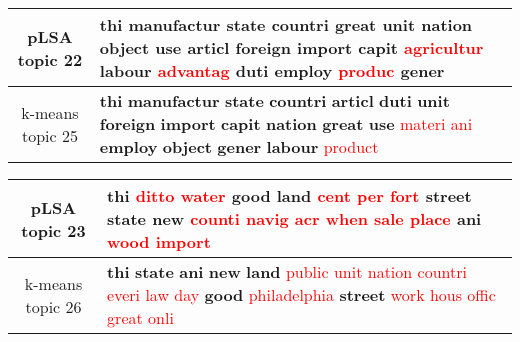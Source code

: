 \begin{center}\begin{tabularx}{\textwidth} {
  | c | >{\raggedright\arraybackslash}X | } \hline 
pLSA topic 22 & \textbf{thi} \textbf{manufactur} \textbf{state} \textbf{countri} \textbf{great} \textbf{unit} \textbf{nation} \textbf{object} \textbf{use} \textbf{articl} \textbf{foreign} \textbf{import} \textbf{capit} \textcolor{red}{agricultur} \textbf{labour} \textcolor{red}{advantag} \textbf{duti} \textbf{employ} \textcolor{red}{produc} \textbf{gener} \\ \hline 
k-means topic 25 & \textbf{thi} \textbf{manufactur} \textbf{state} \textbf{countri} \textbf{articl} \textbf{duti} \textbf{unit} \textbf{foreign} \textbf{import} \textbf{capit} \textbf{nation} \textbf{great} \textbf{use} \textcolor{red}{materi} \textcolor{red}{ani} \textbf{employ} \textbf{object} \textbf{gener} \textbf{labour} \textcolor{red}{product} \\ \hline 
\end{tabularx}

\end{center}

\begin{center}\begin{tabularx}{\textwidth} {
  | c | >{\raggedright\arraybackslash}X | } \hline 
pLSA topic 23 & \textbf{thi} \textcolor{red}{ditto} \textcolor{red}{water} \textbf{good} \textbf{land} \textcolor{red}{cent} \textcolor{red}{per} \textcolor{red}{fort} \textbf{street} \textbf{state} \textbf{new} \textcolor{red}{counti} \textcolor{red}{navig} \textcolor{red}{acr} \textcolor{red}{when} \textcolor{red}{sale} \textcolor{red}{place} \textbf{ani} \textcolor{red}{wood} \textcolor{red}{import} \\ \hline 
k-means topic 26 & \textbf{thi} \textbf{state} \textbf{ani} \textbf{new} \textbf{land} \textcolor{red}{public} \textcolor{red}{unit} \textcolor{red}{nation} \textcolor{red}{countri} \textcolor{red}{everi} \textcolor{red}{law} \textcolor{red}{day} \textbf{good} \textcolor{red}{philadelphia} \textbf{street} \textcolor{red}{work} \textcolor{red}{hous} \textcolor{red}{offic} \textcolor{red}{great} \textcolor{red}{onli} \\ \hline 
\end{tabularx}

\end{center}

